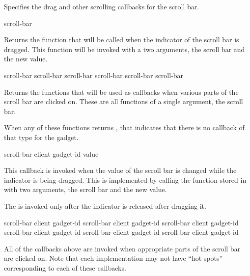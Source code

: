 
Specifies the drag and other scrolling callbacks for the scroll bar.

 {scroll-bar}

Returns the function that will be called when the indicator of the scroll bar is
dragged.  This function will be invoked with a two arguments, the scroll bar and
the new value.

 {scroll-bar}
 {scroll-bar}
 {scroll-bar}
 {scroll-bar}
 {scroll-bar}
 {scroll-bar}

Returns the functions that will be used as callbacks when various parts of the
scroll bar are clicked on.  These are all functions of a single argument, the
scroll bar.

When any of these functions returns , that indicates that there is no
callback of that type for the gadget.

 {scroll-bar client gadget-id value}

This callback is invoked when the value of the scroll bar is changed while the
indicator is being dragged.  This is implemented by calling the function stored
in  with two arguments, the scroll bar and the new
value.

The  is invoked only after the indicator is released
after dragging it.

 {scroll-bar client gadget-id}
 {scroll-bar client gadget-id}
 {scroll-bar client gadget-id}
 {scroll-bar client gadget-id}
 {scroll-bar client gadget-id}
 {scroll-bar client gadget-id}

All of the callbacks above are invoked when appropriate parts of the scroll bar
are clicked on.  Note that each implementation may not have ``hot spots''
corresponding to each of these callbacks.

